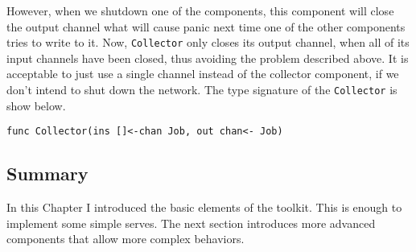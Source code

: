 However, when we shutdown
one of the components, this component will close the output channel
what will cause panic next time one of the other components tries to write
to it. Now, \texttt{Collector} only closes its output channel, when
all of its input channels have been closed, thus avoiding the problem 
described above. It is acceptable to just use a single channel instead of
the collector component, if we don't intend to shut down the network.
The type signature of the \texttt{Collector} is show below.
\begin{lstlisting}
func Collector(ins []<-chan Job, out chan<- Job)
\end{lstlisting}


\subsection{Summary}
In this Chapter I introduced the basic elements of the toolkit. This 
is enough to implement some simple serves. The next section introduces
more advanced components that allow more complex behaviors.


